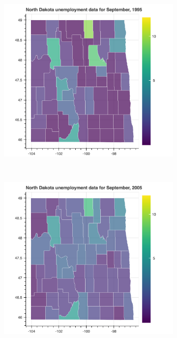 \documentclass[11pt,letterpaper]{article}
\begin{document}
\begin{figure}[h!]
\centering
\begin{subfigure}{0.3\textwidth}
\includegraphics[width=1.2\linewidth]{nd_unemp_1995}
\end{subfigure}
~
\begin{subfigure}{0.3\textwidth}
\includegraphics[width=1.2\linewidth]{nd_unemp_2005}
\end{subfigure}

\end{figure}
\end{document}
